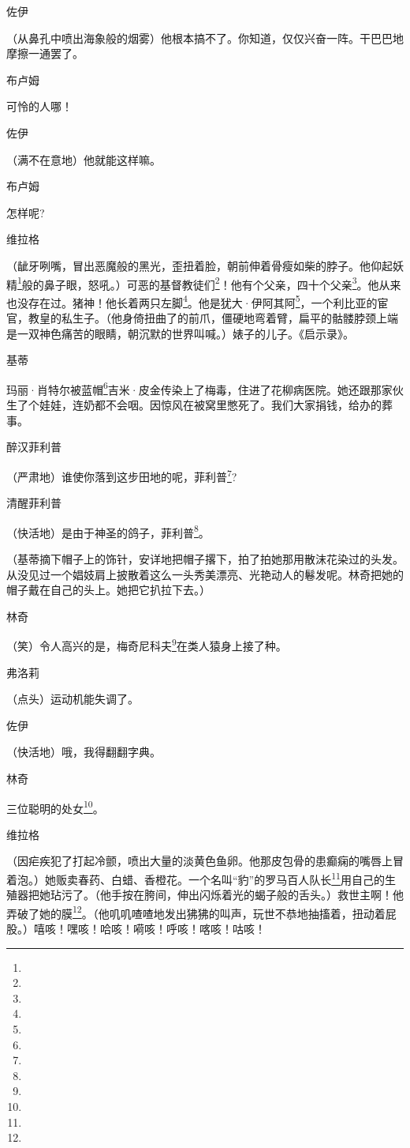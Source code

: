 \par 佐伊
\par （从鼻孔中喷出海象般的烟雾）他根本搞不了。你知道，仅仅兴奋一阵。干巴巴地摩擦一通罢了。
\par 布卢姆
\par 可怜的人哪！
\par 佐伊
\par （满不在意地）他就能这样嘛。
\par 布卢姆
\par 怎样呢?
\par 维拉格
\par （龇牙咧嘴，冒出恶魔般的黑光，歪扭着脸，朝前伸着骨瘦如柴的脖子。他仰起妖精\footnote{}般的鼻子眼，怒吼。）可恶的基督教徒们\footnote{}！他有个父亲，四十个父亲\footnote{}。他从来也没存在过。猪神！他长着两只左脚\footnote{}。他是犹大·伊阿其阿\footnote{}，一个利比亚的宦官，教皇的私生子。（他身倚扭曲了的前爪，僵硬地弯着臂，扁平的骷髅脖颈上端是一双神色痛苦的眼睛，朝沉默的世界叫喊。）婊子的儿子。《启示录》。
\par 基蒂
\par 玛丽·肖特尔被蓝帽\footnote{}吉米·皮金传染上了梅毒，住进了花柳病医院。她还跟那家伙生了个娃娃，连奶都不会咽。因惊风在被窝里憋死了。我们大家捐钱，给办的葬事。
\par 醉汉菲利普
\par （严肃地）谁使你落到这步田地的呢，菲利普\footnote{}?
\par 清醒菲利普
\par （快活地）是由于神圣的鸽子，菲利普\footnote{}。
\par （基蒂摘下帽子上的饰针，安详地把帽子撂下，拍了拍她那用散沫花染过的头发。从没见过一个娼妓肩上披散着这么一头秀美漂亮、光艳动人的鬈发呢。林奇把她的帽子戴在自己的头上。她把它扒拉下去。）
\par 林奇
\par （笑）令人高兴的是，梅奇尼科夫\footnote{}在类人猿身上接了种。
\par 弗洛莉
\par （点头）运动机能失调了。
\par 佐伊
\par （快活地）哦，我得翻翻字典。
\par 林奇
\par 三位聪明的处女\footnote{}。
\par 维拉格
\par （因疟疾犯了打起冷颤，喷出大量的淡黄色鱼卵。他那皮包骨的患癫痫的嘴唇上冒着泡。）她贩卖春药、白蜡、香橙花。一个名叫“豹”的罗马百人队长\footnote{}用自己的生殖器把她玷污了。（他手按在胯间，伸出闪烁着光的蝎子般的舌头。）救世主啊！他弄破了她的膜\footnote{}。（他叽叽喳喳地发出狒狒的叫声，玩世不恭地抽搐着，扭动着屁股。）嘻咳！嘿咳！哈咳！嗬咳！呼咳！喀咳！咕咳！

